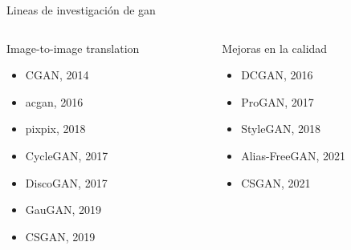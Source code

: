 \begin{frame}{Lineas de investigación de \gls{gan}}

    \begin{columns}[T]
    \begin{column}{0.48\textwidth}
    \alert{\Large Image-to-image translation}
    \begin{itemize}
        \item CGAN, 2014\cite{mirza2014conditional}
        \item \gls{acgan}, 2016\cite{odena2016conditional}
        \item pixpix, 2018\cite{isola2017image}
        \item CycleGAN, 2017\cite{isola2017image}
        \item DiscoGAN, 2017\cite{kim2017learning}
        \item GauGAN, 2019\cite{park2019semantic}
        \item CSGAN, 2019\cite{kancharagunta2019csgan}
    \end{itemize}
    \end{column}
    \hfill
    
    \begin{column}{.48\textwidth}
    \alert{\Large Mejoras en la calidad}
    \begin{itemize}
        \item DCGAN, 2016\cite{radford2015unsupervised}
        \item ProGAN, 2017\cite{karras2017progressive}
        \item StyleGAN, 2018\cite{karras2018style}
        \item Alias-FreeGAN, 2021\cite{karras2021alias}
        \item CSGAN, 2021\cite{kancharagunta2019csgan}
    \end{itemize}
    \end{column}
    \end{columns}
    
\end{frame}

